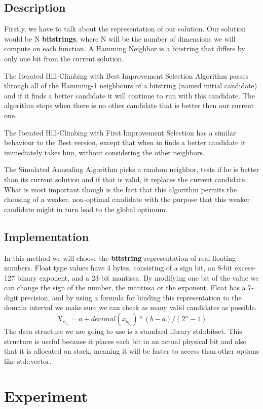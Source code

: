 \documentclass{article}
\begin{document}
\subsection{Description}
Firstly, we have to talk about the representation of our solution. 
Our solution would be N  \textbf{bitstrings}, where N will be the number of dimensions we will compute on each function.
A Hamming Neighbor is a bitstring that differs by only one bit from the current solution.

The Iterated Hill-Climbing with Best Improvement Selection Algorithm passes through all of the Hamming-1 neighbours of a bitstring (named initial candidate) and if it finds a better candidate it will continue to run with this candidate. The algorithm stops when there is no other candidate that is better then our current one.

The Iterated Hill-Climbing with First Improvement Selection has a similar behaviour to the Best version, except that when in finds a better candidate it immediately takes him, without considering the other neighbors.

The Simulated Annealing Algorithm picks a random neighbor, tests if he is better than its current solution and if that is valid, it replaces the current candidate. What is most important though is the fact that this algorithm permits the choosing of a weaker, non-optimal candidate with the purpose that this weaker candidate might in turn lead to the global optimum.

\subsection{Implementation}
In this method we will choose the \textbf{bitstring} representation of real floating numbers. Float type values have 4 bytes, consisting of a sign bit, an 8-bit excess-127 binary exponent, and a 23-bit mantissa. By modifying one bit of the value we can change the sign of the number, the mantissa or the exponent.
Float has a 7-digit precision, and by using a formula for binding this representation to the domain interval we make sure we can check as many valid candidates as possible.
$$ X_r_e_a_l = a+decimal(x_b_i_t_i)*(b-a)/(2^n-1)$$
The data structure we are going to use is a standard library std::bitset. This structure is useful because it places each bit in an actual physical bit and also that it is allocated on stack, meaning it will be faster to access than other options like std::vector.

\section{Experiment}
\end{document}
